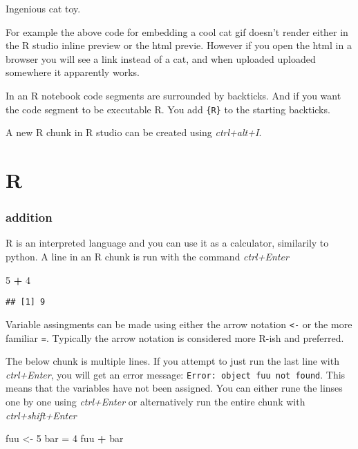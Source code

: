 \documentclass[]{article}
\newenvironment{Shaded}{\begin{snugshade}}{\end{snugshade}}
\newcommand{\DecValTok}[1]{\textcolor[rgb]{0.00,0.00,0.81}{#1}}
\newcommand{\StringTok}[1]{\textcolor[rgb]{0.31,0.60,0.02}{#1}}
\newcommand{\OperatorTok}[1]{\textcolor[rgb]{0.81,0.36,0.00}{\textbf{#1}}}
\newcommand{\NormalTok}[1]{#1}
\begin{document}
Ingenious cat toy.

For example the above code for embedding a cool cat gif doesn't render
either in the R studio inline preview or the html previe. However if you
open the html in a browser you will see a link instead of a cat, and
when uploaded uploaded somewhere it apparently works.

In an R notebook code segments are surrounded by backticks. And if you
want the code segment to be executable R. You add \texttt{\{R\}} to the
starting backticks.

A new R chunk in R studio can be created using \emph{ctrl+alt+I}.

\section{R}\label{r}

\subsubsection{addition}\label{addition}

R is an interpreted language and you can use it as a calculator,
similarily to python. A line in an R chunk is run with the command
\emph{ctrl+Enter}

\begin{Shaded}
\begin{Highlighting}[]
\DecValTok{5} \OperatorTok{+}\StringTok{ }\DecValTok{4}
\end{Highlighting}
\end{Shaded}

\begin{verbatim}
## [1] 9
\end{verbatim}

Variable assingments can be made using either the arrow notation
\texttt{\textless{}-} or the more familiar \texttt{=}. Typically the
arrow notation is considered more R-ish and preferred.

The below chunk is multiple lines. If you attempt to just run the last
line with \emph{ctrl+Enter}, you will get an error message:
\texttt{Error:\ object\ \textquotesingle{}fuu\textquotesingle{}\ not\ found}.
This means that the variables have not been assigned. You can either
rune the linses one by one using \emph{ctrl+Enter} or alternatively run
the entire chunk with \emph{ctrl+shift+Enter}

\begin{Shaded}
\begin{Highlighting}[]
\NormalTok{fuu <-}\StringTok{ }\DecValTok{5}
\NormalTok{bar =}\StringTok{ }\DecValTok{4}
\NormalTok{fuu }\OperatorTok{+}\StringTok{ }\NormalTok{bar}
\end{Highlighting}
\end{Shaded}
\end{document}
